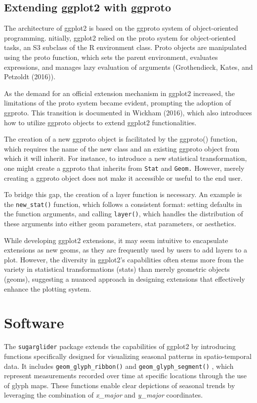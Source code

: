 \subsection{Extending ggplot2 with ggproto}\label{extending-ggplot2-with-ggproto}

The architecture of ggplot2 is based on the ggproto system of object-oriented programming. nitially, ggplot2 relied on the proto system for object-oriented tasks, an S3 subclass of the R environment class. Proto objects are manipulated using the proto function, which sets the parent environment, evaluates expressions, and manages lazy evaluation of arguments (Grothendieck, Kates, and Petzoldt (2016)).

As the demand for an official extension mechanism in ggplot2 increased, the limitations of the proto system became evident, prompting the adoption of ggproto. This transition is documented in Wickham (2016), which also introduces how to utilize ggproto objects to extend ggplot2 functionalities.

The creation of a new ggproto object is facilitated by the ggproto() function, which requires the name of the new class and an existing ggproto object from which it will inherit. For instance, to introduce a new statistical transformation, one might create a ggproto that inherits from \texttt{Stat} and \texttt{Geom.} However, merely creating a ggproto object does not make it accessible or useful to the end user.

To bridge this gap, the creation of a layer function is necessary. An example is the \texttt{new\_stat()} function, which follows a consistent format: setting defaults in the function arguments, and calling \texttt{layer()}, which handles the distribution of these arguments into either geom parameters, stat parameters, or aesthetics.

While developing ggplot2 extensions, it may seem intuitive to encapsulate extensions as new geoms, as they are frequently used by users to add layers to a plot. However, the diversity in ggplot2's capabilities often stems more from the variety in statistical transformations (stats) than merely geometric objects (geoms), suggesting a nuanced approach in designing extensions that effectively enhance the plotting system.

\section{Software}\label{software}

The \texttt{sugarglider} package extends the capabilities of ggplot2 by introducing functions specifically designed for visualizing seasonal patterns in spatio-temporal data. It includes \texttt{geom\_glyph\_ribbon()} and \texttt{geom\_glyph\_segment()} , which represent measurements recorded over time at specific locations through the use of glyph maps. These functions enable clear depictions of seasonal trends by leveraging the combination of \emph{x\_major} and \emph{y\_major} coordinates.

